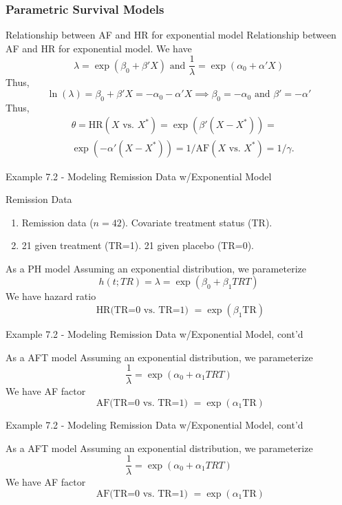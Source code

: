 \documentclass{beamer}
\theoremstyle{definition}
\begin{document}
\begin{frame}
\frametitle{Parametric Survival Models}
\begin{block}{Relationship between AF and HR for exponential model}
Relationship between AF and HR for exponential model. We have
\[
\lambda = \exp(\beta_0 + \beta'X) \text{ and } \frac{1}{\lambda} = \exp(\alpha_0 + \alpha'X)
\]
Thus,
\[ \ln(\lambda) = \beta_0 + \beta'X = -\alpha_0 - \alpha'X \implies \beta_0 = -\alpha_0 \text{ and } \beta'=-\alpha' \]
Thus,
\begin{align*}
&\theta = \text{HR}(X \text{ vs. } X^*) = \exp(\beta'(X - X^*)) =\\
&\exp(-\alpha'(X - X^*)) = 1/\text{AF}(X \text{ vs. } X^*) = 1/\gamma.
\end{align*}
\end{block}
\end{frame}

\begin{frame}{Example 7.2 - Modeling Remission Data w/Exponential Model}
\begin{block}{Remission Data}
\begin{enumerate}[ ]
\item Remission data ($n=42$). Covariate treatment status (TR).
\item 21 given treatment (TR=1). 21 given placebo (TR=0).
\end{enumerate}
\end{block}
\begin{block}{As a PH model}
Assuming an exponential distribution, we parameterize
\[ h(t;TR)= \lambda = \exp(\beta_0 + \beta_1 TRT)
\]
We have hazard ratio
\[
\text{ HR(TR=0 vs. TR=1) } = \exp(\beta_1 \text{TR})
\]
 \end{block}
 \end{frame}

\begin{frame}{Example 7.2 - Modeling Remission Data w/Exponential Model, cont'd}
\begin{block}{As a AFT model}
Assuming an exponential distribution, we parameterize
\[ \frac{1}{\lambda} = \exp(\alpha_0 + \alpha_1 TRT)
\]
We have AF factor
\[
\text{ AF(TR=0 vs. TR=1) } = \exp(\alpha_1 \text{TR})
\]
 \end{block}
 \end{frame}

\begin{frame}{Example 7.2 - Modeling Remission Data w/Exponential Model, cont'd}
\begin{block}{As a AFT model}
Assuming an exponential distribution, we parameterize
\[ \frac{1}{\lambda} = \exp(\alpha_0 + \alpha_1 TRT)
\]
We have AF factor
\[
\text{ AF(TR=0 vs. TR=1) } = \exp(\alpha_1 \text{TR})
\]
 \end{block}
 \end{frame}
\end{document}
